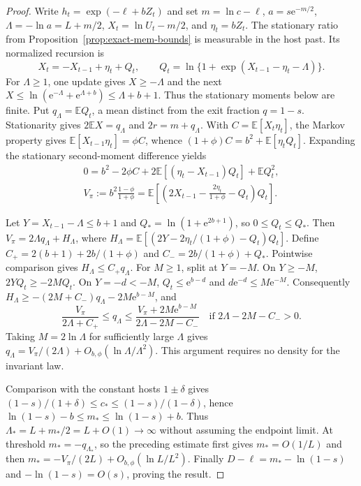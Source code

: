 \begin{proof}
Write $h_t=\exp(-\ell+bZ_t)$ and set
$m=\ln c-\ell$, $a=s\mathrm e^{-m/2}$, $\Lambda=-\ln a=L+m/2$,
$X_t=\ln U_t-m/2$, and $\eta_t=bZ_t$. The stationary ratio from
Proposition~\ref{prop:exact-mem-bounds} is measurable in the host past.
Its normalized recursion is
\begin{equation}
 X_t=-X_{t-1}+\eta_t+Q_t,\qquad
 Q_t=\ln\{1+\exp(X_{t-1}-\eta_t-\Lambda)\}.
 \label{eq:exact-mem-small-map}
\end{equation}
For $\Lambda\geq1$, one update gives $X\geq-\Lambda$ and the next
$X\leq\ln(\mathrm e^{-\Lambda}+\mathrm e^{\Lambda+b})
\leq\Lambda+b+1$. Thus the stationary moments below are finite.
Put $q_\Lambda=\mathbb E Q_t$, a mean distinct from the exit fraction
$q=1-s$. Stationarity gives $2\mathbb E X=q_\Lambda$ and
$2r=m+q_\Lambda$. With $C=\mathbb E[X_t\eta_t]$, the Markov property
gives $\mathbb E[X_{t-1}\eta_t]=\phi C$, whence
$(1+\phi)C=b^2+\mathbb E[\eta_tQ_t]$. Expanding the stationary
second-moment difference yields
\begin{equation}
\begin{gathered}
 0=b^2-2\phi C+2\mathbb E[(\eta_t-X_{t-1})Q_t]+\mathbb E Q_t^2,\\
 V_\pi:=b^2\frac{1-\phi}{1+\phi}
 =\mathbb E\left[\left(2X_{t-1}
       -\frac{2\eta_t}{1+\phi}-Q_t\right)Q_t\right].
 \label{eq:exact-mem-small-moment}
\end{gathered}
\end{equation}

Let $Y=X_{t-1}-\Lambda\leq b+1$ and
$Q_*=\ln(1+\mathrm e^{2b+1})$, so $0\leq Q_t\leq Q_*$.
Then $V_\pi=2\Lambda q_\Lambda+H_\Lambda$, where
$H_\Lambda=\mathbb E[(2Y-2\eta_t/(1+\phi)-Q_t)Q_t]$.
Define $C_+=2(b+1)+2b/(1+\phi)$ and
$C_-=2b/(1+\phi)+Q_*$. Pointwise comparison gives
$H_\Lambda\leq C_+q_\Lambda$. For $M\geq1$, split at $Y=-M$.
On $Y\geq-M$, $2YQ_t\geq-2MQ_t$. On $Y=-d<-M$,
$Q_t\leq\mathrm e^{b-d}$ and $d\mathrm e^{-d}\leq M\mathrm e^{-M}$.
Consequently $H_\Lambda\geq-(2M+C_-)q_\Lambda-2M\mathrm e^{b-M}$, and
\begin{equation}
 \frac{V_\pi}{2\Lambda+C_+}\leq q_\Lambda\leq
 \frac{V_\pi+2M\mathrm e^{b-M}}{2\Lambda-2M-C_-}
 \quad\text{if }2\Lambda-2M-C_->0.
 \label{eq:exact-mem-small-bracket}
\end{equation}
Taking $M=2\ln\Lambda$ for sufficiently large $\Lambda$ gives
$q_\Lambda=V_\pi/(2\Lambda)+O_{b,\phi}(\ln\Lambda/\Lambda^2)$.
This argument requires no density for the invariant law.

Comparison with the constant hosts $1\pm\delta$ gives
$(1-s)/(1+\delta)\leq c_*\leq(1-s)/(1-\delta)$, hence
$\ln(1-s)-b\leq m_*\leq\ln(1-s)+b$.
Thus $\Lambda_*=L+m_*/2=L+O(1)\to\infty$ without assuming the
endpoint limit. At threshold $m_*=-q_{\Lambda_*}$, so the preceding
estimate first gives $m_*=O(1/L)$ and then
$m_*=-V_\pi/(2L)+O_{b,\phi}(\ln L/L^2)$.
Finally $D-\ell=m_*-\ln(1-s)$ and $-\ln(1-s)=O(s)$, proving the result.
\end{proof}

